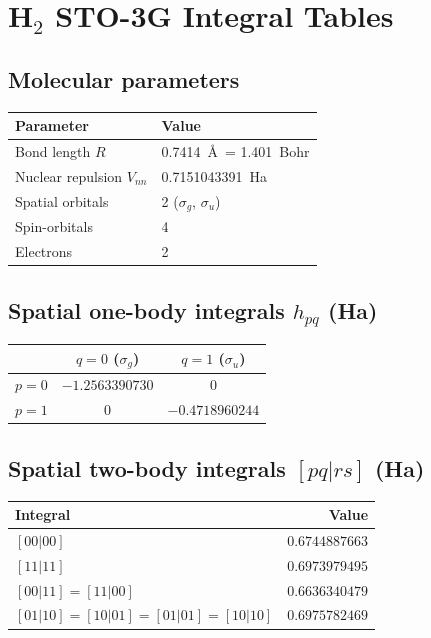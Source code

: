 \documentclass[aps,prb,preprint,longbibliography,nofootinbib]{revtex4-2}
\begin{document}
\appendix

\section{H$_2$ STO-3G Integral Tables}
\label{app:integrals}

\subsection{Molecular parameters}

\begin{table}[h]
\centering
\begin{tabular}{@{}ll@{}}
\toprule
\textbf{Parameter} & \textbf{Value} \\
\midrule
Bond length $R$ & 0.7414~\AA\ = 1.401~Bohr \\
Nuclear repulsion $V_{nn}$ & 0.7151043391~Ha \\
Spatial orbitals & 2 ($\sigma_g$, $\sigma_u$) \\
Spin-orbitals & 4 \\
Electrons & 2 \\
\bottomrule
\end{tabular}
\end{table}

\subsection{Spatial one-body integrals $h_{pq}$ (Ha)}

\begin{table}[h]
\centering
\begin{tabular}{@{}lcc@{}}
\toprule
& $q = 0$ ($\sigma_g$) & $q = 1$ ($\sigma_u$) \\
\midrule
$p = 0$ & $-1.2563390730$ & $0$ \\
$p = 1$ & $0$ & $-0.4718960244$ \\
\bottomrule
\end{tabular}
\end{table}

\subsection{Spatial two-body integrals $[pq|rs]$ (Ha)}

\begin{table}[h]
\centering
\begin{tabular}{@{}lr@{}}
\toprule
\textbf{Integral} & \textbf{Value} \\
\midrule
$[00|00]$ & $0.6744887663$ \\
$[11|11]$ & $0.6973979495$ \\
$[00|11] = [11|00]$ & $0.6636340479$ \\
$[01|10] = [10|01] = [01|01] = [10|10]$ & $0.6975782469$ \\
\bottomrule
\end{tabular}
\end{table}
\end{document}
